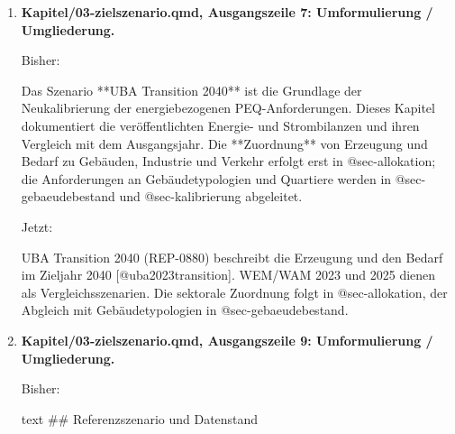 \documentclass[
  ngerman,
  a4paper,
  DIV=11]{scrreprt}
\newenvironment{Shaded}{\begin{snugshade}}{\end{snugshade}}
\newcommand{\NormalTok}[1]{\textcolor[rgb]{0.00,0.23,0.31}{#1}}
\begin{document}
\begin{enumerate}
\begin{Shaded}
\begin{Highlighting}[]
\NormalTok{UBA Transition 2040 als einheitliche Referenz für die nationale Energieaufgabe}
\end{Highlighting}
\end{Shaded}

  Jetzt:

\begin{Shaded}
\begin{Highlighting}[]
\NormalTok{UBA Transition 2040 als Referenz der nationalen Energieaufgabe}
\end{Highlighting}
\end{Shaded}
\item
  \textbf{Kapitel/03-zielszenario.qmd, Ausgangszeile 7: Umformulierung /
  Umgliederung.}

  Bisher:

\begin{Shaded}
\begin{Highlighting}[]
\NormalTok{Das Szenario **UBA Transition 2040** ist die Grundlage der Neukalibrierung der energiebezogenen PEQ{-}Anforderungen. Dieses Kapitel dokumentiert die veröffentlichten Energie{-} und Strombilanzen und ihren Vergleich mit dem Ausgangsjahr. Die **Zuordnung** von Erzeugung und Bedarf zu Gebäuden, Industrie und Verkehr erfolgt erst in @sec{-}allokation; die Anforderungen an Gebäudetypologien und Quartiere werden in @sec{-}gebaeudebestand und @sec{-}kalibrierung abgeleitet.}
\end{Highlighting}
\end{Shaded}

  Jetzt:

\begin{Shaded}
\begin{Highlighting}[]
\NormalTok{UBA Transition 2040 (REP{-}0880) beschreibt die Erzeugung und den Bedarf im Zieljahr 2040 [@uba2023transition]. WEM/WAM 2023 und 2025 dienen als Vergleichsszenarien. Die sektorale Zuordnung folgt in @sec{-}allokation, der Abgleich mit Gebäudetypologien in @sec{-}gebaeudebestand.}
\end{Highlighting}
\end{Shaded}
\item
  \textbf{Kapitel/03-zielszenario.qmd, Ausgangszeile 9: Umformulierung /
  Umgliederung.}

  Bisher:

  \textsubscript{}text \#\# Referenzszenario und Datenstand


\end{enumerate}
\end{document}
